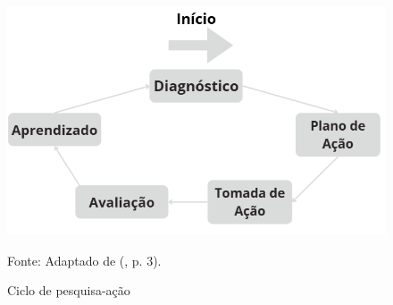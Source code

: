 \begin{figure}[H]
    \caption{Ciclo de pesquisa-ação}
    \centering
    \includegraphics[width=0.5\linewidth]{images/metodologia/pesquisaacao.png}
    \label{fig:pesquisaacao}
    
    Fonte: Adaptado de \citeauthor{staron2020} (\citeyear{staron2020}, p. 3).
\end{figure}